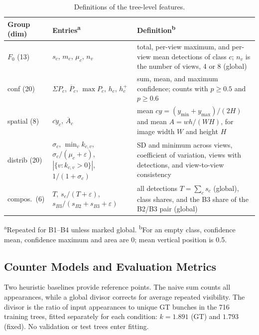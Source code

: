 \documentclass[conference,a4paper]{IEEEtran}
\begin{document}
\begin{table}[!tb]
  \centering
  \footnotesize
  \renewcommand{\arraystretch}{1.13}
  \setlength{\tabcolsep}{3pt}
  \caption{Definitions of the tree-level features.}
  \label{tab:features}
  \begin{tabular}{@{}l>{\raggedright\arraybackslash}p{}>{\raggedright\arraybackslash}p{}@{}}
    \toprule
    Group (dim) & Entries\textsuperscript{a} & Definition\textsuperscript{b} \\
    \midrule
    $F_0$ (13) & $s_c$, $m_c$, $\mu_c$, $n_v$
      & total, per-view maximum, and per-view mean detections of class $c$;
        $n_v$ is the number of views, 4 or 8 (global) \\
    \addlinespace[2pt]
    conf (20) & $\Sigma P_c$, $\overline{P}_c$, $\max P_c$, $h_c$, $h^{+}_c$
      & sum, mean, and maximum confidence; counts with $p \ge 0.5$ and
        $p \ge 0.6$ \\
    \addlinespace[2pt]
    spatial (8) & $\overline{cy}_c$, $\overline{A}_c$
      & mean $cy=(y_{\min}+y_{\max})/(2H)$ and mean
        $A=wh/(WH)$, for image width $W$ and height $H$ \\
    \addlinespace[2pt]
    distrib (20) & $\sigma_c$, $\min_v k_{c,v}$,
      $\sigma_c/(\mu_c{+}\varepsilon)$, $|\{v\!:\!k_{c,v}{>}0\}|$,
      $1/(1{+}\sigma_c)$
      & SD and minimum across views, coefficient of variation, views with
        detections, and view-to-view consistency \\
    \addlinespace[2pt]
    compos.\ (6) & $T$, $s_c/(T{+}\varepsilon)$,
      $s_{B3}/(s_{B2}{+}s_{B3}{+}\varepsilon)$
      & all detections $T=\sum_c s_c$ (global), class shares, and the B3 share
        of the B2/B3 pair (global) \\
    \bottomrule
  \end{tabular}
\par\vspace{1pt}
  \begin{minipage}{\columnwidth}
    \footnotesize\raggedright
    \textsuperscript{a}Repeated for B1--B4 unless marked global. \textsuperscript{b}For an empty class, confidence mean, confidence maximum and area are 0; mean vertical position is 0.5.
  \end{minipage}
\end{table}

\subsection{Counter Models and Evaluation Metrics}
Two heuristic baselines provide reference points. The naive sum counts all
appearances, while a global divisor corrects for average repeated visibility.
The divisor is the ratio of input appearances to unique GT bunches in the
716 training trees, fitted separately for each condition:
$k=1.891$ (GT) and $1.793$ (fixed). No validation or test trees enter fitting.
\end{document}
